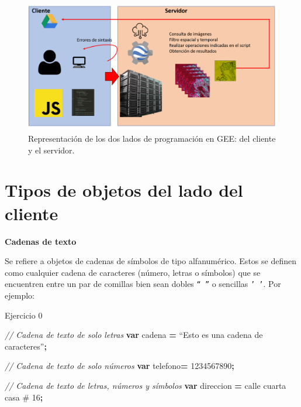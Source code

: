 \documentclass[
  12pt,
  letterpaper,
  twoside]{book}
\newenvironment{Shaded}{\begin{snugshade}}{\end{snugshade}}
\newcommand{\CommentTok}[1]{\textcolor[rgb]{0.56,0.35,0.01}{\textit{#1}}}
\newcommand{\KeywordTok}[1]{\textcolor[rgb]{0.13,0.29,0.53}{\textbf{#1}}}
\newcommand{\NormalTok}[1]{#1}
\newcommand{\OperatorTok}[1]{\textcolor[rgb]{0.81,0.36,0.00}{\textbf{#1}}}
\newcommand{\StringTok}[1]{\textcolor[rgb]{0.31,0.60,0.02}{#1}}
\begin{document}
\begin{figure}

{\centering \includegraphics[width=1\linewidth]{Img/daigFunc} 

}

\caption{Representación de los dos lados de programación en GEE: del cliente y el servidor.}\label{fig:unnamed-chunk-33}
\end{figure}

\hypertarget{tipos-de-objetos-del-lado-del-cliente}{%
\section{Tipos de objetos del lado del cliente}\label{tipos-de-objetos-del-lado-del-cliente}}

\textbf{Cadenas de texto}

Se refiere a objetos de cadenas de símbolos de tipo alfanumérico. Estos se definen como cualquier cadena de caracteres (número, letras o símbolos) que se encuentren entre un par de comillas bien sean dobles \texttt{“\ ”} o sencillas \texttt{’\ ’}. Por ejemplo:

Ejercicio 0

\begin{Shaded}
\begin{Highlighting}[]
\CommentTok{// Cadena de texto de solo letras}
\KeywordTok{var}\NormalTok{ cadena }\OperatorTok{=}\NormalTok{ “Esto es una cadena de caracteres”}\OperatorTok{;}

\CommentTok{// Cadena de texto de solo números}
\KeywordTok{var}\NormalTok{ telefono}\OperatorTok{=} \StringTok{\textquotesingle{}1234567890\textquotesingle{}}\OperatorTok{;}  
                     
\CommentTok{// Cadena de texto de letras, números y símbolos}
\KeywordTok{var}\NormalTok{ direccion }\OperatorTok{=} \StringTok{\textquotesingle{}calle cuarta casa \# 16\textquotesingle{}}\OperatorTok{;}
\end{Highlighting}
\end{Shaded}
\end{document}
